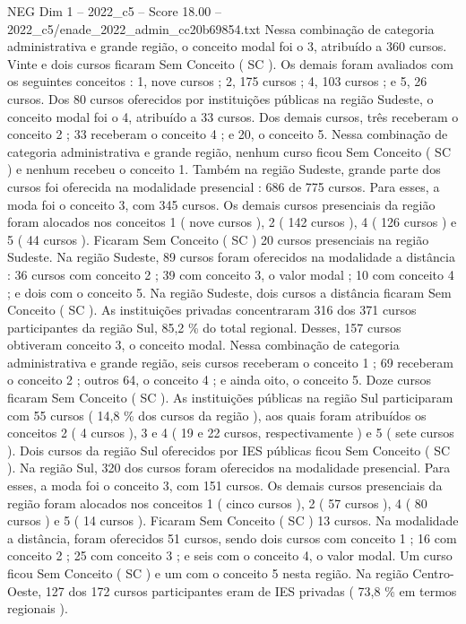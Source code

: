 \begin{textsample}{NEG Dim 1 – 2022\_c5 – Score 18.00 – 2022\_c5/enade\_2022\_admin\_cc20b69854.txt}
Nessa combinação de categoria administrativa e grande região, o conceito modal foi o 3, atribuído a 360 cursos.
Vinte e dois cursos ficaram Sem Conceito ( SC ).
Os demais foram avaliados com os seguintes conceitos : 1, nove cursos ; 2, 175 cursos ; 4, 103 cursos ; e 5, 26 cursos.
Dos 80 cursos oferecidos por instituições públicas na região Sudeste, o conceito modal foi o 4, atribuído a 33 cursos.
Dos demais cursos, três receberam o conceito 2 ; 33 receberam o conceito 4 ; e 20, o conceito 5.
Nessa combinação de categoria administrativa e grande região, nenhum curso ficou Sem Conceito ( SC ) e nenhum recebeu o conceito 1.
Também na região Sudeste, grande parte dos cursos foi oferecida na modalidade presencial : 686 de 775 cursos.
Para esses, a moda foi o conceito 3, com 345 cursos.
Os demais cursos presenciais da região foram alocados nos conceitos 1 ( nove cursos ), 2 ( 142 cursos ), 4 ( 126 cursos ) e 5 ( 44 cursos ).
Ficaram Sem Conceito ( SC ) 20 cursos presenciais na região Sudeste.
Na região Sudeste, 89 cursos foram oferecidos na modalidade a distância : 36 cursos com conceito 2 ; 39 com conceito 3, o valor modal ; 10 com conceito 4 ; e dois com o conceito 5.
Na região Sudeste, dois cursos a distância ficaram Sem Conceito ( SC ).
As instituições privadas concentraram 316 dos 371 cursos participantes da região Sul, 85,2 \% do total regional.
Desses, 157 cursos obtiveram conceito 3, o conceito modal.
Nessa combinação de categoria administrativa e grande região, seis cursos receberam o conceito 1 ; 69 receberam o conceito 2 ; outros 64, o conceito 4 ; e ainda oito, o conceito 5.
Doze cursos ficaram Sem Conceito ( SC ).
As instituições públicas na região Sul participaram com 55 cursos ( 14,8 \% dos cursos da região ), aos quais foram atribuídos os conceitos 2 ( 4 cursos ), 3 e 4 ( 19 e 22 cursos, respectivamente ) e 5 ( sete cursos ).
Dois cursos da região Sul oferecidos por IES públicas ficou Sem Conceito ( SC ).
Na região Sul, 320 dos cursos foram oferecidos na modalidade presencial.
Para esses, a moda foi o conceito 3, com 151 cursos.
Os demais cursos presenciais da região foram alocados nos conceitos 1 ( cinco cursos ), 2 ( 57 cursos ), 4 ( 80 cursos ) e 5 ( 14 cursos ).
Ficaram Sem Conceito ( SC ) 13 cursos.
Na modalidade a distância, foram oferecidos 51 cursos, sendo dois cursos com conceito 1 ; 16 com conceito 2 ; 25 com conceito 3 ; e seis com o conceito 4, o valor modal.
Um curso ficou Sem Conceito ( SC ) e um com o conceito 5 nesta região.
Na região Centro-Oeste, 127 dos 172 cursos participantes eram de IES privadas ( 73,8 \% em termos regionais ).

\end{textsample}
